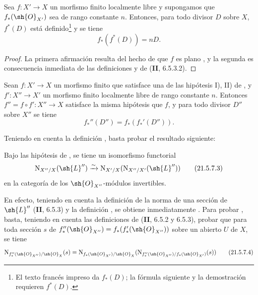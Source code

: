 \begin{proposition}[21.5.6]
\label{IV.21.5.6}
Sea $f:X'\to X$ un morfismo finito localmente libre y supongamos que $f_*(\sh{O}_{X'})$ sea de rango constante $n$.
Entonces, para todo divisor $D$ sobre $X$, $f^*(D)$ está definido\footnote{El texto francés impreso da $f_*(D)$; la fórmula siguiente y la demostración requieren $f^*(D)$.} y se tiene
\[
\label{IV.21.5.6.1}
  f_*(f^*(D))=nD.
  \tag{21.5.6.1}
\]
\end{proposition}

\begin{proof}
La primera afirmación resulta del hecho de que $f$ es plano , y la segunda es consecuencia inmediata de las definiciones y de (\textbf{II}, 6.5.3.2).
\end{proof}

\begin{proposition}[21.5.7]
\label{IV.21.5.7}
Sean $f:X'\to X$ un morfismo finito que satisface una de las hipótesis \textup{I), II)} de , y $f':X''\to X'$ un morfismo finito localmente libre de rango constante $n$.
Entonces $f''=f\circ f':X''\to X$ satisface la misma hipótesis que $f$, y para todo divisor $D''$ sobre $X''$ se tiene
\[
\label{IV.21.5.7.1}
  f_*''(D'')=f_*(f_*'(D'')).
  \tag{21.5.7.1}
\]
\end{proposition}

Teniendo en cuenta la definición , basta probar el resultado siguiente:

\begin{lemma}[21.5.7.2]
\label{IV.21.5.7.2}
Bajo las hipótesis de , se tiene un isomorfismo functorial
\[
\label{IV.21.5.7.3}
  \mathrm{N}_{X''/X}(\sh{L}'')\xrightarrow{\sim}\mathrm{N}_{X'/X}(\mathrm{N}_{X''/X'}(\sh{L}''))
  \tag{21.5.7.3}
\]
en la categoría de los $\sh{O}_{X''}$-módulos invertibles.
\end{lemma}

En efecto, teniendo en cuenta la definición de la norma de una sección de $\sh{L}''$ (\textbf{II}, 6.5.3) y la definición , se obtiene inmediatamente .
Para probar , basta, teniendo en cuenta las definiciones de (\textbf{II}, 6.5.2 y 6.5.3), probar que para toda sección $s$ de $f_*''(\sh{O}_{X''})=f_*(f_*'(\sh{O}_{X''}))$ sobre un abierto $U$ de $X$, se tiene
\[
\label{IV.21.5.7.4}
  \mathrm{N}_{f_*''(\sh{O}_{X''})/\sh{O}_X}(s)=\mathrm{N}_{f_*(\sh{O}_{X'})/\sh{O}_X}(\mathrm{N}_{f_*''(\sh{O}_{X''})/f_*(\sh{O}_{X'})}(s))
  \tag{21.5.7.4}
\]


